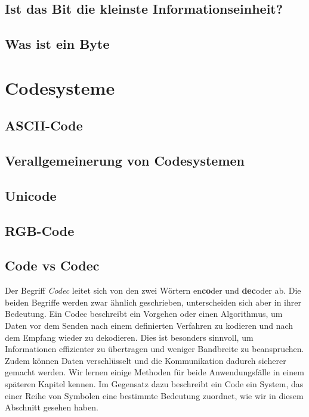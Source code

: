 \documentclass[
  letterpaper,
  DIV=11]{scrreprt}
\begin{document}
\section{Ist das Bit die kleinste
Informationseinheit?}\label{ist-das-bit-die-kleinste-informationseinheit}

\section{Was ist ein Byte}\label{was-ist-ein-byte}

\chapter{Codesysteme}\label{codesysteme}

\section{ASCII-Code}\label{ascii-code}

\section{Verallgemeinerung von
Codesystemen}\label{verallgemeinerung-von-codesystemen}

\section{Unicode}\label{unicode}

\section{RGB-Code}\label{rgb-code}

\section{Code vs Codec}\label{code-vs-codec}

Der Begriff \emph{Codec} leitet sich von den zwei Wörtern
en\textbf{co}der und \textbf{dec}oder ab. Die beiden Begriffe werden
zwar ähnlich geschrieben, unterscheiden sich aber in ihrer Bedeutung.
Ein Codec beschreibt ein Vorgehen oder einen Algorithmus, um Daten vor
dem Senden nach einem definierten Verfahren zu kodieren und nach dem
Empfang wieder zu dekodieren. Dies ist besonders sinnvoll, um
Informationen effizienter zu übertragen und weniger Bandbreite zu
beanspruchen. Zudem können Daten verschlüsselt und die Kommunikation
dadurch sicherer gemacht werden. Wir lernen einige Methoden für beide
Anwendungsfälle in einem späteren Kapitel kennen. Im Gegensatz dazu
beschreibt ein Code ein System, das einer Reihe von Symbolen eine
bestimmte Bedeutung zuordnet, wie wir in diesem Abschnitt gesehen haben.
\end{document}
